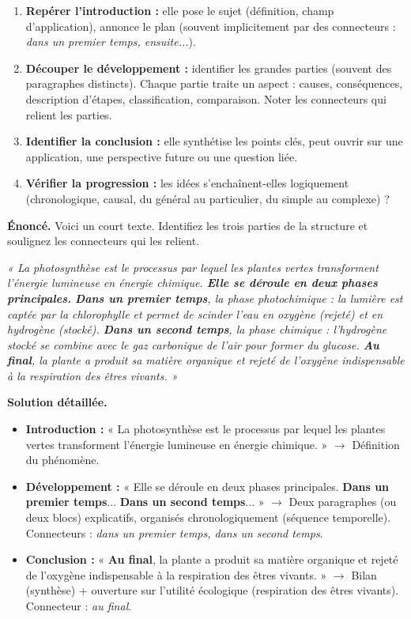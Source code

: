 \documentclass[11pt]{article}
\begin{document}
\begin{methode}
\begin{enumerate}
    \item \textbf{Repérer l'introduction :} elle pose le sujet (définition, champ d'application), annonce le plan (souvent implicitement par des connecteurs : \emph{dans un premier temps, ensuite...}).
    \item \textbf{Découper le développement :} identifier les grandes parties (souvent des paragraphes distincts). Chaque partie traite un aspect : causes, conséquences, description d'étapes, classification, comparaison. Noter les connecteurs qui relient les parties.
    \item \textbf{Identifier la conclusion :} elle synthétise les points clés, peut ouvrir sur une application, une perspective future ou une question liée.
    \item \textbf{Vérifier la progression :} les idées s'enchaînent-elles logiquement (chronologique, causal, du général au particulier, du simple au complexe) ?
\end{enumerate}
\end{methode}

\begin{exoresolu}
\textbf{Énoncé.} Voici un court texte. Identifiez les trois parties de la structure et soulignez les connecteurs qui les relient.

\textit{« La photosynthèse est le processus par lequel les plantes vertes transforment l'énergie lumineuse en énergie chimique. \textbf{Elle se déroule en deux phases principales.} \textbf{Dans un premier temps}, la phase photochimique : la lumière est captée par la chlorophylle et permet de scinder l'eau en oxygène (rejeté) et en hydrogène (stocké). \textbf{Dans un second temps}, la phase chimique : l'hydrogène stocké se combine avec le gaz carbonique de l'air pour former du glucose. \textbf{Au final}, la plante a produit sa matière organique et rejeté de l'oxygène indispensable à la respiration des êtres vivants. »}

\textbf{Solution détaillée.}
\begin{itemize}
    \item \textbf{Introduction :} « La photosynthèse est le processus par lequel les plantes vertes transforment l'énergie lumineuse en énergie chimique. » $\rightarrow$ Définition du phénomène.
    \item \textbf{Développement :} « Elle se déroule en deux phases principales. \textbf{Dans un premier temps}... \textbf{Dans un second temps}... » $\rightarrow$ Deux paragraphes (ou deux blocs) explicatifs, organisés chronologiquement (séquence temporelle). Connecteurs : \emph{dans un premier temps, dans un second temps}.
    \item \textbf{Conclusion :} « \textbf{Au final}, la plante a produit sa matière organique et rejeté de l'oxygène indispensable à la respiration des êtres vivants. » $\rightarrow$ Bilan (synthèse) + ouverture sur l'utilité écologique (respiration des êtres vivants). Connecteur : \emph{au final}.
\end{itemize}
\end{exoresolu}
\end{document}
